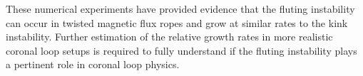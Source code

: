 These numerical experiments have provided evidence that the fluting instability can occur in twisted magnetic flux ropes and grow at similar rates to the kink instability. Further estimation of the relative growth rates in more realistic coronal loop setups is required to fully understand if the fluting instability plays a pertinent role in coronal loop physics.
